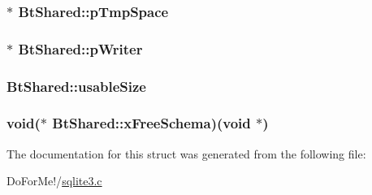 \hypertarget{struct_bt_shared_a89102c20327da8a304f7e95af557bdf4}{
\subsubsection[{p\-Tmp\-Space}]{$\ast$ Bt\-Shared\-::p\-Tmp\-Space}}\label{struct_bt_shared_a89102c20327da8a304f7e95af557bdf4}
\hypertarget{struct_bt_shared_ad8b2679e54027d58a3be3afcca4df1d6}{
\subsubsection[{p\-Writer}]{$\ast$ Bt\-Shared\-::p\-Writer}}\label{struct_bt_shared_ad8b2679e54027d58a3be3afcca4df1d6}
\hypertarget{struct_bt_shared_a3209efe543084a7e60f22913a794f5cb}{
\subsubsection[{usable\-Size}]{ Bt\-Shared\-::usable\-Size}}\label{struct_bt_shared_a3209efe543084a7e60f22913a794f5cb}
\hypertarget{struct_bt_shared_a7c4816c63acea30ed44ffc58b468463e}{
\subsubsection[{x\-Free\-Schema}]{\setlength{\rightskip}{0pt plus 5cm}void($\ast$ Bt\-Shared\-::x\-Free\-Schema)(void $\ast$)}}\label{struct_bt_shared_a7c4816c63acea30ed44ffc58b468463e}


The documentation for this struct was generated from the following file\-:\begin{DoxyCompactItemize}
\item 
Do\-For\-Me!/\hyperlink{sqlite3_8c}{sqlite3.\-c}\end{DoxyCompactItemize}
